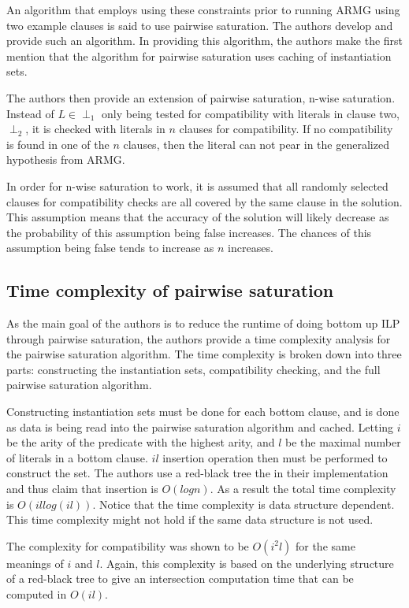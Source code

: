 \documentclass[jair,twoside,11pt,theapa]{article}
\begin{document}
An algorithm that employs using these constraints prior to running ARMG using two example clauses is said to use pairwise saturation. The authors develop and provide such an algorithm. In providing this algorithm, the authors make the first mention that the algorithm for pairwise saturation uses caching of instantiation sets. 

The authors then provide an extension of pairwise saturation, n-wise saturation. Instead of $L \in \perp_1$ only being tested for compatibility with literals in clause two, $\perp_2$, it is checked with literals in $n$ clauses for compatibility. If no compatibility is found in one of the $n$ clauses, then the literal can not pear in the generalized hypothesis from ARMG.  

In order for n-wise saturation to work, it is assumed that all randomly selected clauses for compatibility checks are all covered by the same clause in the solution. This assumption means that the accuracy of the solution will likely decrease as the probability of this assumption being false increases. The chances of this assumption being false tends to increase as $n$ increases. 

\subsection{Time complexity of pairwise saturation}
As the main goal of the authors is to reduce the runtime of doing bottom up ILP through pairwise saturation, the authors provide a time complexity analysis for the pairwise saturation algorithm. The time complexity is broken down into three parts: constructing the instantiation sets, compatibility checking, and the full pairwise saturation algorithm. 

Constructing instantiation sets must be done for each bottom clause, and is done as data is being read into the pairwise saturation algorithm and cached. Letting $i$ be the arity of the predicate with the highest arity, and $l$ be the maximal number of literals in a bottom clause. $il$ insertion operation then must be performed to construct the set. The authors use a red-black tree the in their implementation and thus claim that insertion is $O(log n)$. As a result the total time complexity is $O(il log(il))$. Notice that the time complexity is data structure dependent. This time complexity might not hold if the same data structure is not used. 

The complexity for compatibility was shown to be $O(i^2l)$ for the same meanings of $i$ and $l$. Again, this complexity is based on the underlying structure of a red-black tree to give an intersection computation time that can be computed in $O(il)$. 
\end{document}
